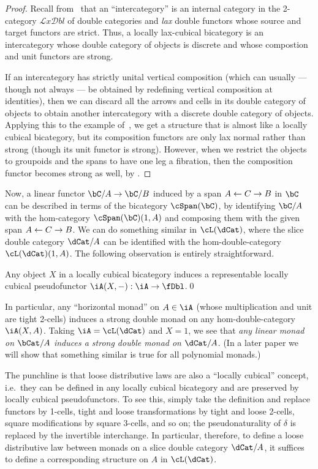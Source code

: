 \documentclass{amsart}
\newcommand{\dl}{\delta}
\def\lxdbl{\ensuremath{\mathcal{L}\mathit{x}\mathcal{D}\mathit{bl}}\xspace}
\begin{document}
\begin{proof}
  Recall from~\cite{gp:intercategories-i,gp:intercategories-ii} that an ``intercategory'' is an internal category in the 2-category \lxdbl of double categories and \emph{lax} double functors whose source and target functors are strict.
  Thus, a locally lax-cubical bicategory is an intercategory whose double category of objects is discrete and whose compostion and unit functors are strong.

  If an intercategory has strictly unital vertical composition (which can usually --- though not always --- be obtained by redefining vertical composition at identities), then we can discard all the arrows and cells in its double category of objects to obtain another intercategory with a discrete double category of objects.
  Applying this to the example of~\cite[6.5]{gp:intercategories-ii}, we get a structure that is almost like a locally cubical bicategory, but its composition functors are only lax normal rather than strong (though its unit functor is strong).
  However, when we restrict the objects to groupoids and the spans to have one leg a fibration, then the composition functor becomes strong as well, by \cite[Proposition 49]{garner:double-clubs}.
\end{proof}

Now, a linear functor $\bC/A\to \bC/B$ induced by a span $A \leftarrow C \to B$ in $\bC$ can be described in terms of the bicategory $\cSpan(\bC)$, by identifying $\bC/A$ with the hom-category $\cSpan(\bC)(1,A)$ and composing them with the given span $A \leftarrow C \to B$.
We can do something similar in $\cL(\dCat)$, where the slice double category $\dCat/A$ can be identified with the hom-double-category $\cL(\dCat)(1,A)$.
The following observation is entirely straightforward.

\begin{thm}
  Any object $X$ in a locally cubical bicategory \iA induces a representable locally cubical pseudofunctor $\iA(X,-):\iA \to \fDbl$.\qed
\end{thm}

In particular, any ``horizontal monad'' on $A\in \iA$ (whose multiplication and unit are tight 2-cells) induces a strong double monad on any hom-double-category $\iA(X,A)$.
Taking $\iA=\cL(\dCat)$ and $X=1$, we see that \emph{any linear monad on $\bCat/A$ induces a strong double monad on $\dCat/A$}.
(In a later paper we will show that something similar is true for all polynomial monads.)

The punchline is that loose distributive laws are also a ``locally cubical'' concept, i.e.\ they can be defined in any locally cubical bicategory and are preserved by locally cubical pseudofunctors.
To see this, simply take the definition and replace functors by 1-cells, tight and loose transformations by tight and loose 2-cells, square modifications by square 3-cells, and so on; the pseudonaturality of $\dl$ is replaced by the invertible interchange.
In particular, therefore, to define a loose distributive law between monads on a slice double category $\dCat/A$, it suffices to define a corresponding structure on $A$ in $\cL(\dCat)$.
\end{document}

